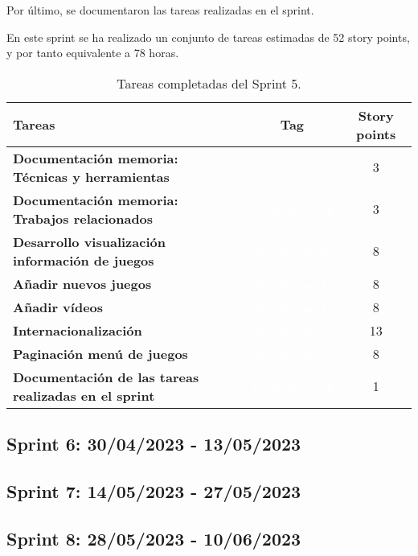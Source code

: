 Por último, se documentaron las tareas realizadas en el sprint.

En este sprint se ha realizado un conjunto de tareas estimadas de 52 story points, y por tanto equivalente a 78 horas.

\begin{table}[ht!]
    \centering
    \resizebox{15cm}{!} {
    \begin{tabular}{|l|c|c|}
    \hline
    \rowcolor[rgb]{0.99,0.93,0.93}
    \textbf{Tareas}     &\textbf{Tag}     & \textbf{Story points} \\ \hline
    \textbf{Documentación memoria: Técnicas y herramientas}          &\cellcolor[rgb]{0.0,0.33,0.71}\textcolor{white}{documentation}      &3 \\ \hline 
    \textbf{Documentación memoria: Trabajos relacionados}          &\cellcolor[rgb]{0.0,0.33,0.71}\textcolor{white}{documentation}      &3 \\ \hline 
    \textbf{Desarrollo visualización información de juegos}         &\cellcolor[rgb]{0.99,0.83,0.93}\textcolor{white}{development}      &8 \\ \hline
     \textbf{Añadir nuevos juegos}         &\cellcolor[rgb]{0.99,0.83,0.93}\textcolor{white}{development}      &8 \\ \hline 
    \textbf{Añadir vídeos}         &\cellcolor[rgb]{0.99,0.83,0.93}\textcolor{white}{development}      &8 \\ \hline 
    \textbf{Internacionalización}         &\cellcolor[rgb]{0.99,0.83,0.93}\textcolor{white}{development}      &13 \\ \hline 
    \textbf{Paginación menú de juegos}         &\cellcolor[rgb]{0.99,0.83,0.93}\textcolor{white}{development}      &8 \\ \hline 
    \textbf{Documentación de las tareas realizadas en el sprint}         &\cellcolor[rgb]{0.0,0.33,0.71}\textcolor{white}{documentation}      &1 \\ \hline 
    \end{tabular}}
    \caption{Tareas completadas del Sprint 5.}
    \label{tab:my_label}
\end{table}

\subsection{Sprint 6: 30/04/2023 - 13/05/2023}
\subsection{Sprint 7: 14/05/2023 - 27/05/2023}
\subsection{Sprint 8: 28/05/2023 - 10/06/2023}

